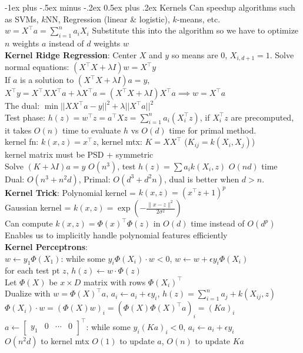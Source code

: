 \documentclass[10pt,landscape]{article}
\makeatletter
\renewcommand{\section}{\@startsection{section}{1}{0mm}%
                                {-1ex plus -.5ex minus -.2ex}%
                                {0.5ex plus .2ex}%
                                {\normalfont\large\bfseries}}
\makeatother
\begin{document}
\begin{multicols}{3}
\section{$\boxed{\text{Kernels}}$}
Can speedup algorithms such as SVMs, $k$NN, Regression (linear \& logistic), $k$-means, etc.
\\
$w = X^\top a = \sum_{i=1}^n a_i X_i$
Substitute this into the algorithm so we have to optimize $n$ weights $a$ instead of $d$ weights $w$ \\
\textbf{Kernel Ridge Regression}: Center $X$ and $y$ so means are 0, $X_{i, d+1} = 1$. Solve normal equations: $(X^\top X + \lambda I)w = X^\top y$\\
If $a$ is a solution to $(X^\top X + \lambda I) a = y$, $X^\top y = X^\top X X^\top a + \lambda X^\top a = (X^\top X + \lambda I) X^\top a \implies w = X^\top a$\\
The dual: $\min ||X X^\top a - y||^2 + \lambda ||X^\top a||^2$\\
Test phase: $h(z) = w^\top z = a^\top X z = \sum_{i=1}^n a_i(X_i^\top z)$, if $X_i^\top z$ are precomputed, it takes $O(n)$ time to evaluate $h$ vs $O(d)$ time for primal method. \\
kernel fn: $k(x, z) = x^\top z$, kernel mtx: $K = X X^\top$ ($K_{ij} = k(X_i, X_j)$)\\
kernel matrix must be PSD + symmetric
\\
Solve $(K+\lambda I)a=y$ $O(n^3)$, test $h(z) = \sum a_i k(X_i, z)$ $O(nd)$ time \\
Dual: $O(n^3 + n^2 d)$, Primal: $O(d^3 + d^2 n)$, dual is better when $d>n$.\\
\textbf{Kernel Trick}: Polynomial kernel = $k(x, z) = (x^\top z + 1)^p$ \\ Gaussian kernel = $k(x, z)=\exp \left(-\frac{\|x-z\|^2}{2 \sigma^2}\right)$\\
Can compute $k(x, z) = \Phi(x)^\top \Phi(z)$ in $O(d)$ time instead of $O(d^p)$\\
Enables us to implicitly handle polynomial features efficiently \\
\textbf{Kernel Perceptrons}:\\
$w \leftarrow y_1 \Phi(X_1)$: while some $y_i \Phi(X_i) \cdot w < 0$, $w \leftarrow w + \epsilon y_i \Phi(X_i)$ \\
for each test pt $z$, $h(z) \leftarrow w \cdot \Phi(z)$\\
Let $\Phi(X)$ be $x \times D$ matrix with rows $\Phi(X_i)^\top$ \\
Dualize with $w = \Phi(X)^\top a$, $a_i \leftarrow a_i + \epsilon y_i$, $h(z) = \sum_{i=1}^n a_j + k(X_{ij}, z)$ \\
$\Phi(X_i) \cdot w = (\Phi(X) w)_i = (\Phi(X) \Phi(X)^\top a)_i = (Ka)_i$\\
$a \leftarrow \begin{bmatrix}
y_1 & 0 & \cdots & 0
\end{bmatrix}^\top$: while some $y_i(Ka)_i < 0$, $a_i \leftarrow a_i + \epsilon y_i$\\
$O(n^2 d)$ to kernel mtx $O(1)$ to update $a$, $O(n)$ to update $Ka$


\end{multicols}
\end{document}
